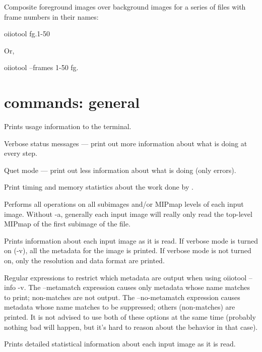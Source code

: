 \noindent Composite foreground images over background images for a
series of files with frame numbers in their names:
\begin{code}
    oiiotool fg.1-50%
\end{code}

\noindent Or,
\begin{code}
    oiiotool --frames 1-50 fg.%
\end{code}


\newpage
\section{\oiiotool commands: general}

Prints usage information to the terminal.
\apiend

Verbose status messages --- print out more information about what
\oiiotool is doing at every step.
\apiend

Quet mode --- print out less information about what \oiiotool is doing
(only errors).
\apiend

Print timing and memory statistics about the work done by \oiiotool.
\apiend

Performs all operations on all subimages and/or MIPmap levels of each
input image.  Without {\cf -a}, generally each input image will really
only read the top-level MIPmap of the first subimage of the file.
\apiend

Prints information about each input image as it is read.  If verbose mode
is turned on ({\cf -v}), all the metadata for the image is printed.
If verbose mode is not turned on, only the resolution and data format
are printed.
\apiend

Regular expressions to restrict which metadata are output when using
{\cf oiiotool --info -v}.  The {\cf --metamatch} expression causes only
metadata whose name matches to print; non-matches are not output.  The
{\cf --no-metamatch} expression causes metadata whose name matches to be
suppressed; others (non-matches) are printed.  It is not advised to use
both of these options at the same time (probably nothing bad will
happen, but it's hard to reason about the behavior in that case).
\apiend

Prints detailed statistical information about each input image as it is
read.
\apiend

